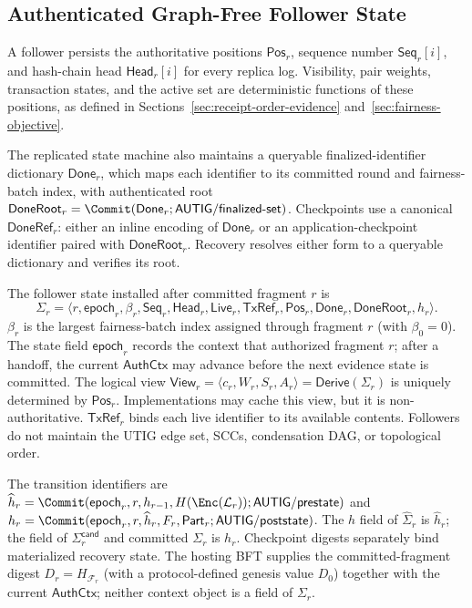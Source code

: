 \subsection{Authenticated Graph-Free Follower State}
\label{sec:authenticated-evidence-state}

A follower persists the authoritative positions $\mathsf{Pos}_r$, sequence
number $\mathsf{Seq}_r[i]$, and hash-chain head $\mathsf{Head}_r[i]$ for every
replica log.  Visibility, pair weights, transaction states, and the active set
are deterministic functions of these positions, as defined in
Sections~\ref{sec:receipt-order-evidence} and~\ref{sec:fairness-objective}.

The replicated state machine also maintains a queryable finalized-identifier
dictionary $\mathsf{Done}_r$, which maps each identifier to its committed round
and fairness-batch index, with authenticated root
$\mathsf{DoneRoot}_r=\Commit(\mathsf{Done}_r;
\mathsf{AUTIG/finalized\mbox{-}set})$.  Checkpoints use a canonical
$\mathsf{DoneRef}_r$: either an inline encoding of $\mathsf{Done}_r$ or an
application-checkpoint identifier paired with $\mathsf{DoneRoot}_r$.  Recovery
resolves either form to a queryable dictionary and verifies its root.

The follower state installed after committed fragment $r$ is
\begin{equation}
 \Sigma_r=\langle r,\mathsf{epoch}_r,\beta_r,\mathsf{Seq}_r,
 \mathsf{Head}_r,\mathsf{Live}_r,\mathsf{TxRef}_r,\mathsf{Pos}_r,
 \mathsf{Done}_r,\mathsf{DoneRoot}_r,h_r\rangle.
 \label{eq:follower-state}
\end{equation}
$\beta_r$ is the largest fairness-batch index assigned through fragment $r$
(with $\beta_0=0$).  The state field $\mathsf{epoch}_r$ records the context that
authorized fragment $r$; after a handoff, the current $\mathsf{AuthCtx}$ may
advance before the next evidence state is committed.  The logical view
$\mathsf{View}_r=\langle c_r,W_r,S_r,A_r\rangle
=\mathsf{Derive}(\Sigma_r)$ is uniquely determined by $\mathsf{Pos}_r$.
Implementations may cache this view, but it is non-authoritative.
$\mathsf{TxRef}_r$ binds each live identifier to its available contents.
Followers do not maintain the UTIG edge set, SCCs, condensation DAG, or
topological order.

The transition identifiers are
$\widehat h_r=\Commit(\mathsf{epoch}_r,r,h_{r-1},H(\Enc(\mathcal L_r));
\mathsf{AUTIG/prestate})$ and
$h_r=\Commit(\mathsf{epoch}_r,r,\widehat h_r,F_r,\mathsf{Part}_r;
\mathsf{AUTIG/poststate})$.  The $h$ field of $\widehat\Sigma_r$ is
$\widehat h_r$; the field of $\Sigma_r^{\mathsf{cand}}$ and committed
$\Sigma_r$ is $h_r$.  Checkpoint digests separately bind materialized recovery
state.  The hosting BFT supplies the committed-fragment digest
$D_r=H_{\mathcal F_r}$ (with a protocol-defined genesis value $D_0$) together
with the current $\mathsf{AuthCtx}$; neither context object is a field of
$\Sigma_r$.

